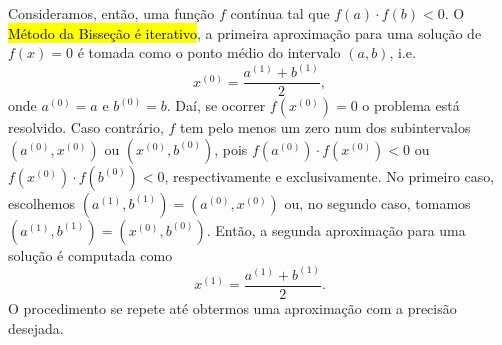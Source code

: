 Consideramos, então, uma função $f$ contínua tal que $f(a)\cdot f(b) < 0$. O \hl{Método da Bisseção é iterativo}, a primeira aproximação para uma solução de $f(x)=0$ é tomada como o ponto médio do intervalo $(a, b)$, i.e.
\begin{equation}
  x^{(0)} = \frac{a^{(1)}+b^{(1)}}{2},
\end{equation}
onde $a^{(0)} = a$ e $b^{(0)} = b$. Daí, se ocorrer $f(x^{(0)})=0$ o problema está resolvido. Caso contrário, $f$ tem pelo menos um zero num dos subintervalos $(a^{(0)}, x^{(0)})$ ou $(x^{(0)}, b^{(0)})$, pois $f(a^{(0)})\cdot f(x^{(0)}) < 0$ ou  $f(x^{(0)})\cdot f(b^{(0)}) < 0$, respectivamente e exclusivamente. No primeiro caso, escolhemos $(a^{(1)}, b^{(1)}) = (a^{(0)}, x^{(0)})$ ou, no segundo caso, tomamos $(a^{(1)}, b^{(1)}) = (x^{(0)}, b^{(0)})$. Então, a segunda aproximação para uma solução é computada como
\begin{equation}
  x^{(1)} = \frac{a^{(1)} + b^{(1)}}{2}.
\end{equation}
O procedimento se repete até obtermos uma aproximação com a precisão desejada.

